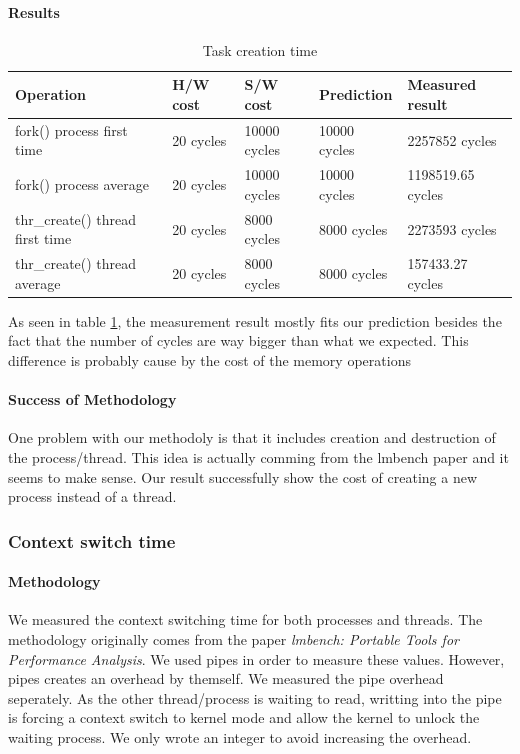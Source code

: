 \paragraph{Results}
\begin{table}[h]
\begin{center}
\begin{tabular}{| l | l | l | l | l |}
\hline
Operation & H/W cost & S/W cost & Prediction & Measured result \\
\hline
fork() process first time		& 20 cycles & 10000 cycles 	& 10000 cycles& 2257852 cycles \\ \hline
fork() process average		& 20 cycles & 10000 cycles 	& 10000 cycles& 1198519.65 cycles \\ \hline
thr\_create() thread first time	& 20 cycles & 8000 cycles		& 8000 cycles &  2273593 cycles \\ \hline
thr\_create() thread 	average	& 20 cycles & 8000 cycles		& 8000 cycles &  157433.27 cycles \\ \hline
\end{tabular}
\end{center}
\caption{Task creation time\label{tab:task-creation}}

\end{table}

As seen in table \ref{tab:task-creation}, the measurement result mostly fits our prediction besides the fact that the number of cycles are way bigger than what we expected.
This difference is probably cause by the cost of the memory operations

\paragraph{Success of Methodology}
One problem with our methodoly is that it includes creation and destruction of
the process/thread.
This idea is actually comming from the lmbench paper and it seems to make sense.
Our result successfully show the cost of creating a new process instead of a
thread.


\subsubsection{Context switch time}
\paragraph{Methodology}

We measured the context switching time for both processes and threads.
The methodology originally comes from the paper \emph{lmbench: Portable Tools for Performance
Analysis}.
We used pipes in order to measure these values.
However, pipes creates an overhead by themself.
We measured the pipe overhead seperately.
As the other thread/process is waiting to read, writting into the pipe is
forcing a context switch to kernel mode and allow the kernel to unlock the
waiting process.
We only wrote an integer to avoid increasing the overhead.

